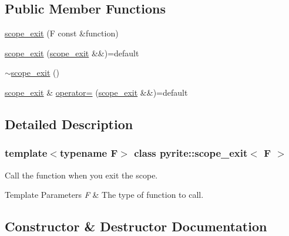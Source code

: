 \subsection*{Public Member Functions}
\begin{DoxyCompactItemize}
\item 
\mbox{\hyperlink{classpyrite_1_1scope__exit_aa91a09b5b29bd1f7596eb35348b55b34}{scope\+\_\+exit}} (F const \&function)
\item 
\mbox{\hyperlink{classpyrite_1_1scope__exit_a35cb6b81607b2ea3ca006a387c3d669f}{scope\+\_\+exit}} (\mbox{\hyperlink{classpyrite_1_1scope__exit}{scope\+\_\+exit}} \&\&)=default
\item 
\mbox{\hyperlink{classpyrite_1_1scope__exit_a724fd7a0fc8fe24fe7ee50f3be68be1f}{$\sim$scope\+\_\+exit}} ()
\item 
\mbox{\hyperlink{classpyrite_1_1scope__exit}{scope\+\_\+exit}} \& \mbox{\hyperlink{classpyrite_1_1scope__exit_a1b2d819eb3eba7a77102a1df5f5a2668}{operator=}} (\mbox{\hyperlink{classpyrite_1_1scope__exit}{scope\+\_\+exit}} \&\&)=default
\end{DoxyCompactItemize}


\subsection{Detailed Description}
\subsubsection*{template$<$typename F$>$\newline
class pyrite\+::scope\+\_\+exit$<$ F $>$}

Call the function when you exit the scope. 
\begin{DoxyTemplParams}{Template Parameters}
{\em F} & The type of function to call. \\
\hline
\end{DoxyTemplParams}


\subsection{Constructor \& Destructor Documentation}
\mbox{\label{classpyrite_1_1scope__exit_aa91a09b5b29bd1f7596eb35348b55b34}} 

